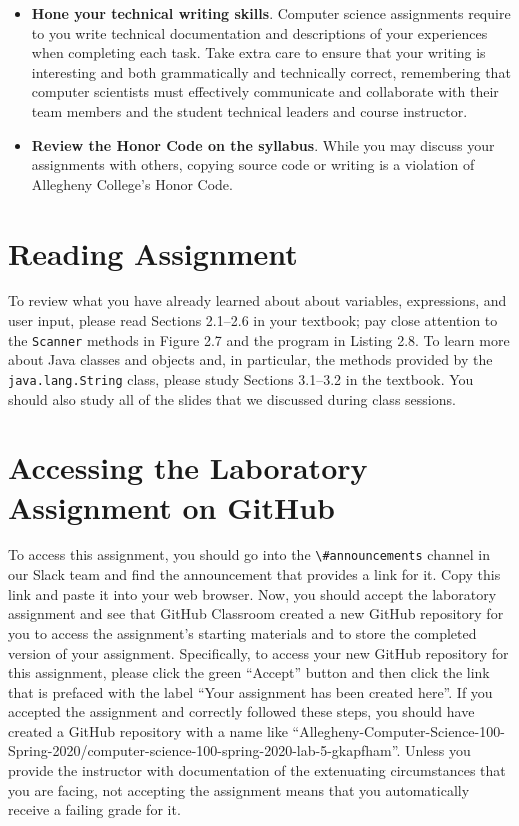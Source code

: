 \documentclass[11pt]{article}
\newcommand{\channel}[1]{\lstinline{#1}}
\begin{document}
\begin{itemize}
\item {\bf Hone your technical writing skills}. Computer science assignments
  require to you write technical documentation and descriptions of your
  experiences when completing each task. Take extra care to ensure that your
  writing is interesting and both grammatically and technically correct,
  remembering that computer scientists must effectively communicate and
  collaborate with their team members and the student technical leaders and
  course instructor.

\item {\bf Review the Honor Code on the syllabus}. While you may discuss your
  assignments with others, copying source code or writing is a violation of
  Allegheny College's Honor Code.

\end{itemize}

\section*{Reading Assignment}

To review what you have already learned about about variables, expressions, and
user input, please read Sections 2.1--2.6 in your textbook; pay close attention
to the {\tt Scanner} methods in Figure 2.7 and the program in Listing 2.8. To
learn more about Java classes and objects and, in particular, the methods
provided by the {\tt java.lang.String} class, please study Sections 3.1--3.2 in
the textbook. You should also study all of the slides that we discussed during
class sessions.


\section*{Accessing the Laboratory Assignment on GitHub}

To access this assignment, you should go into the \channel{\#announcements}
channel in our Slack team and find the announcement that provides a link for it.
Copy this link and paste it into your web browser. Now, you should accept the
laboratory assignment and see that GitHub Classroom created a new GitHub
repository for you to access the assignment's starting materials and to store
the completed version of your assignment. Specifically, to access your new
GitHub repository for this assignment, please click the green ``Accept'' button
and then click the link that is prefaced with the label ``Your assignment has
been created here''. If you accepted the assignment and correctly followed these
steps, you should have created a GitHub repository with a name like
``Allegheny-Computer-Science-100-Spring-2020/computer-science-100-spring-2020-lab-5-gkapfham''.
Unless you provide the instructor with documentation of the extenuating
circumstances that you are facing, not accepting the assignment means that you
automatically receive a failing grade for it.
\end{document}
